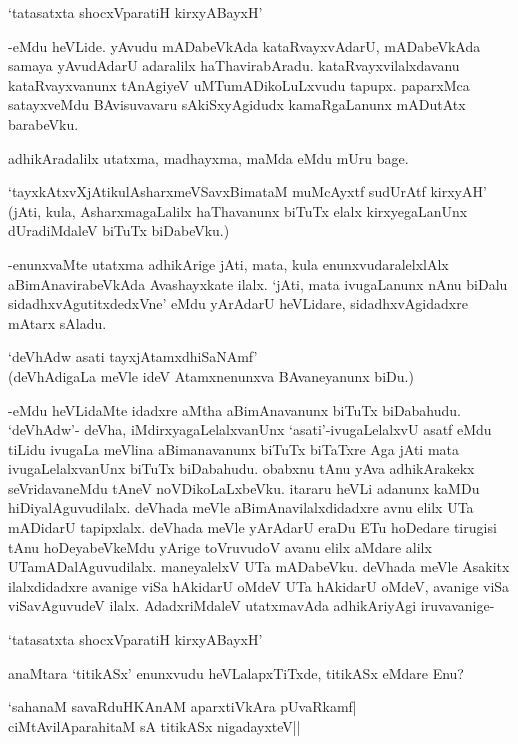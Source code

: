 \begin{shloka}
`tatasatxta shocxVparatiH kirxyABayxH'
\end{shloka}

-eMdu heVLide. yAvudu mADabeVkAda kataRvayxvAdarU, mADabeVkAda samaya yAvudAdarU adaralilx haThavirabAradu. kataRvayxvilalxdavanu kataRvayxvanunx tAnAgiyeV uMTumADikoLuLxvudu tapupx. paparxMca satayxveMdu BAvisuvavaru sAkiSxyAgidudx kamaRgaLanunx mADutAtx barabeVku.

adhikAradalilx utatxma, madhayxma, maMda eMdu mUru bage.

`tayxkAtxvXjAtikulAsharxmeVSavxBimataM muMcAyxtf sudUrAtf kirxyAH' (jAti, kula, AsharxmagaLalilx haThavanunx biTuTx elalx kirxyegaLanUnx dUradiMdaleV biTuTx biDabeVku.)

-enunxvaMte utatxma adhikArige jAti, mata, kula enunxvudaralelxlAlx aBimAnavirabeVkAda Avashayxkate ilalx. `jAti, mata ivugaLanunx nAnu biDalu sidadhxvAgutitxdedxVne' eMdu yArAdarU heVLidare, sidadhxvAgidadxre mAtarx sAladu.

\begin{shloka}
`deVhAdw asati tayxjAtamxdhiSaNAmf'\\
(deVhAdigaLa meVle ideV Atamxnenunxva BAvaneyanunx biDu.)
\end{shloka}

-eMdu heVLidaMte idadxre aMtha aBimAnavanunx biTuTx biDabahudu. `deVhAdw'- deVha, iMdirxyagaLelalxvanUnx `asati'-ivugaLelalxvU asatf eMdu tiLidu ivugaLa meVlina aBimanavanunx biTuTx biTaTxre Aga jAti mata ivugaLelalxvanUnx biTuTx biDabahudu. obabxnu tAnu yAva adhikArakekx seVridavaneMdu tAneV noVDikoLaLxbeVku. itararu heVLi adanunx kaMDu hiDiyalAguvudilalx. deVhada meVle aBimAnavilalxdidadxre avnu elilx UTa mADidarU tapipxlalx. deVhada meVle yArAdarU eraDu ETu hoDedare tirugisi tAnu hoDeyabeVkeMdu yArige toVruvudoV avanu elilx aMdare alilx UTamADalAguvudilalx. maneyalelxV UTa mADabeVku. deVhada meVle Asakitx ilalxdidadxre avanige viSa hAkidarU oMdeV UTa hAkidarU oMdeV, avanige viSa viSavAguvudeV ilalx. AdadxriMdaleV utatxmavAda adhikAriyAgi iruvavanige- 

\begin{shloka}
`tatasatxta shocxVparatiH kirxyABayxH'
\end{shloka}

anaMtara `titikASx' enunxvudu heVLalapxTiTxde, titikASx eMdare Enu?

\begin{shloka}
`sahanaM savaRduHKAnAM aparxtiVkAra pUvaRkamf|\\
ciMtAvilAparahitaM sA titikASx nigadayxteV||
\end{shloka}

